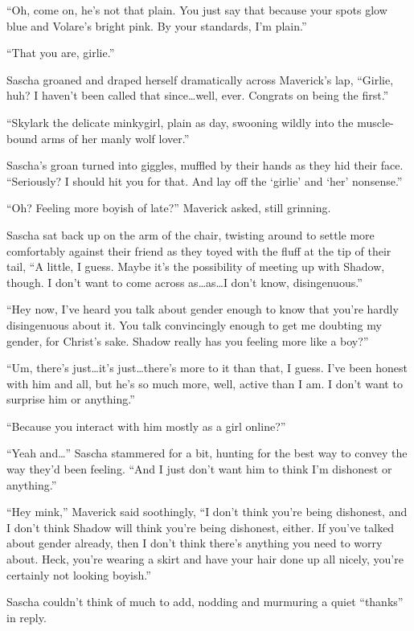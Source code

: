 ``Oh, come on, he's not that plain. You just say that because your spots glow blue and Volare's bright pink. By your standards, I'm plain.''

``That you are, girlie.''

Sascha groaned and draped herself dramatically across Maverick's lap, ``Girlie, huh? I haven't been called that since\ldots{}well, ever. Congrats on being the first.''

``Skylark the delicate minkygirl, plain as day, swooning wildly into the muscle-bound arms of her manly wolf lover.''

Sascha's groan turned into giggles, muffled by their hands as they hid their face. ``Seriously? I should hit you for that. And lay off the `girlie' and `her' nonsense.''

``Oh? Feeling more boyish of late?'' Maverick asked, still grinning.

Sascha sat back up on the arm of the chair, twisting around to settle more comfortably against their friend as they toyed with the fluff at the tip of their tail, ``A little, I guess. Maybe it's the possibility of meeting up with Shadow, though. I don't want to come across as\ldots{}as\ldots{}I don't know, disingenuous.''

``Hey now, I've heard you talk about gender enough to know that you're hardly disingenuous about it. You talk convincingly enough to get me doubting my gender, for Christ's sake. Shadow really has you feeling more like a boy?''

``Um, there's just\ldots{}it's just\ldots{}there's more to it than that, I guess. I've been honest with him and all, but he's so much more, well, active than I am. I don't want to surprise him or anything.''

``Because you interact with him mostly as a girl online?''

``Yeah and\ldots{}'' Sascha stammered for a bit, hunting for the best way to convey the way they'd been feeling. ``And I just don't want him to think I'm dishonest or anything.''

``Hey mink,'' Maverick said soothingly, ``I don't think you're being dishonest, and I don't think Shadow will think you're being dishonest, either. If you've talked about gender already, then I don't think there's anything you need to worry about. Heck, you're wearing a skirt and have your hair done up all nicely, you're certainly not looking boyish.''

Sascha couldn't think of much to add, nodding and murmuring a quiet ``thanks'' in reply.

